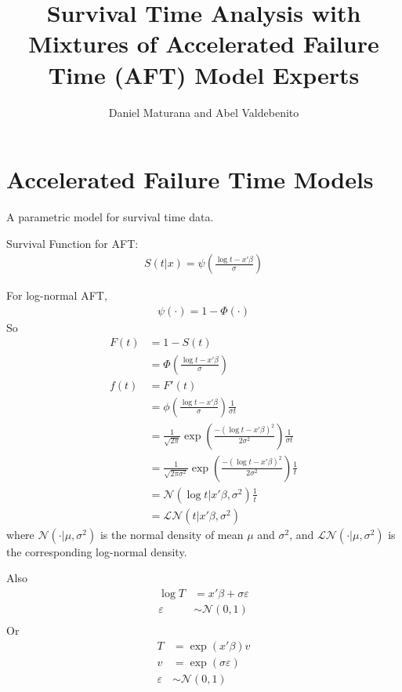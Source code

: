 \documentclass[11pt,letterpaper]{article}
\title{Survival Time Analysis with Mixtures of Accelerated Failure Time (AFT) Model Experts}
\author{Daniel Maturana and Abel Valdebenito}
\begin{document}
\maketitle

\section{Accelerated Failure Time Models}

A parametric model for survival time data.

Survival Function for AFT:
\begin{align*}
    S(t|x) = \psi \left(  \frac{ \log t - x'\beta}{\sigma}\right)
\end{align*}

For log-normal AFT, 
\begin{align*}
    \psi(\cdot) = 1 - \Phi(\cdot)
\end{align*}
So
\begin{align*}
    F(t) &= 1 - S(t) \\
         &= \Phi\left( \frac{\log t - x'\beta}{\sigma} \right) \\
    f(t) &= F'(t) \\
         &= \phi\left( \frac{\log t - x'\beta}{\sigma} \right) \frac{1}{ \sigma t } \\
         &= \frac{1}{\sqrt{2 \pi}} \exp\left( \frac{ -(\log t - x'\beta)^2 }{ 2\sigma^2} \right) \frac{1}{\sigma t} \\
         &= \frac{1}{\sqrt{2 \pi \sigma^2}} \exp\left( \frac{ -(\log t - x'\beta)^2 }{ 2\sigma^2} \right) \frac{1}{t} \\
         &= \mathcal{N}( \log t | x'\beta, \sigma^2 ) \frac{1}{t} \\
         &= \mathcal{LN}( t | x'\beta, \sigma^2 )
\end{align*}
where $\mathcal{N}(\cdot|\mu, \sigma^2)$ is the normal density of mean $\mu$ and $\sigma^2$, and
$\mathcal{LN}(\cdot|\mu, \sigma^2)$ is the corresponding log-normal density.

Also 
\begin{align*}
    \log T  &= x'\beta + \sigma \varepsilon \\
    \varepsilon &\sim \mathcal{N}(0, 1) \\
\end{align*}
Or
\begin{align*}
     T  &= \exp(x'\beta) v \\
     v  &= \exp(\sigma \varepsilon) \\
     \varepsilon &\sim \mathcal{N}(0, 1) 
\end{align*}
\end{document}
